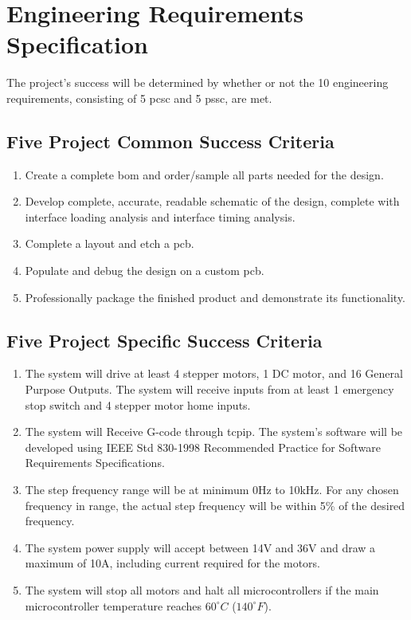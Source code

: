 \chapter{Engineering Requirements Specification}
The project's success will be determined by whether or not the 10 engineering requirements, consisting of 5 \gls{pcsc} and 5 \gls{pssc}, are met. 

\section{Five Project Common Success Criteria}
\begin{enumerate}
	\item Create a complete \gls{bom} and order/sample all parts needed for the design.
	\item Develop complete, accurate, readable schematic of the design, complete with interface loading analysis and interface timing analysis. 
	\item Complete a layout and etch a \gls{pcb}.
	\item Populate and debug the design on a custom \gls{pcb}.
	\item Professionally package the finished product and demonstrate its functionality.
\end{enumerate}

\section{Five Project Specific Success Criteria}
\begin{enumerate}
	\item The system will drive at least 4 stepper motors, 1 DC motor, and 16 General Purpose Outputs.
The system will receive inputs from at least 1 emergency stop switch and 4 stepper motor home inputs.
	\item The system will Receive G-code through \gls{tcpip}.
The system’s software will be developed using IEEE Std 830-1998 Recommended Practice for Software Requirements Specifications.
	\item The step frequency range will be at minimum 0Hz to 10kHz.
For any chosen frequency in range, the actual step frequency will be within 5\% of the desired frequency.
	\item The system power supply will accept between 14V and 36V and draw a maximum of 10A, including current required for the motors. 
	\item The system will stop all motors and halt all microcontrollers if the main microcontroller temperature reaches $60^{\circ}C$ ($140^{\circ}F$).
\end{enumerate}

